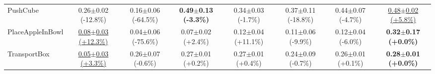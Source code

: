 \begin{table}[htbp]
\begin{adjustbox}{max width=\textwidth}
\begin{tabular}{l*{7}{c}}
PushCube & 0.26$\pm$0.02 \scriptsize{(-12.8\%)} & 0.16$\pm$0.06 \scriptsize{(-64.5\%)} & \textbf{0.49$\pm$0.13 \scriptsize{(-3.3\%)}} & 0.34$\pm$0.03 \scriptsize{(-1.7\%)} & 0.37$\pm$0.11 \scriptsize{(-18.8\%)} & 0.44$\pm$0.07 \scriptsize{(-4.7\%)} & \underline{0.48$\pm$0.02 \scriptsize{(+5.8\%)}} \\
PlaceAppleInBowl & \underline{0.08$\pm$0.03 \scriptsize{(+12.3\%)}} & 0.04$\pm$0.06 \scriptsize{(-75.6\%)} & 0.07$\pm$0.02 \scriptsize{(+2.4\%)} & 0.12$\pm$0.04 \scriptsize{(+11.1\%)} & 0.11$\pm$0.06 \scriptsize{(-9.9\%)} & 0.12$\pm$0.04 \scriptsize{(-6.0\%)} & \textbf{0.32$\pm$0.17 \scriptsize{(+0.0\%)}} \\
TransportBox & \underline{0.05$\pm$0.03 \scriptsize{(+3.3\%)}} & 0.26$\pm$0.07 \scriptsize{(-0.6\%)} & 0.27$\pm$0.01 \scriptsize{(+0.2\%)} & 0.27$\pm$0.01 \scriptsize{(+0.4\%)} & 0.24$\pm$0.09 \scriptsize{(-0.7\%)} & 0.26$\pm$0.01 \scriptsize{(+0.1\%)} & \textbf{0.28$\pm$0.01 \scriptsize{(+0.0\%)}} \\
\bottomrule
\end{tabular}
\end{adjustbox}
\end{table}

